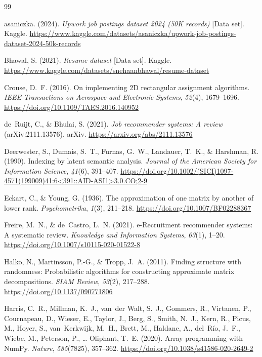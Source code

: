 \documentclass[12pt,a4paper]{article}
\numberwithin{equation}{section}
\theoremstyle{definition}
\theoremstyle{plain}
\begin{document}
\begin{thebibliography}{99}

asaniczka. (2024). \textit{Upwork job postings dataset 2024 (50K records)} [Data set]. Kaggle. \url{https://www.kaggle.com/datasets/asaniczka/upwork-job-postings-dataset-2024-50k-records}

Bhawal, S. (2021). \textit{Resume dataset} [Data set]. Kaggle. \url{https://www.kaggle.com/datasets/snehaanbhawal/resume-dataset}

Crouse, D.~F. (2016). On implementing 2D rectangular assignment algorithms. \textit{IEEE Transactions on Aerospace and Electronic Systems}, \textit{52}(4), 1679--1696. \url{https://doi.org/10.1109/TAES.2016.140952}

de~Ruijt, C., \& Bhulai, S. (2021). \textit{Job recommender systems: A review} (arXiv:2111.13576). arXiv. \url{https://arxiv.org/abs/2111.13576}

Deerwester, S., Dumais, S.~T., Furnas, G.~W., Landauer, T.~K., \& Harshman, R. (1990). Indexing by latent semantic analysis. \textit{Journal of the American Society for Information Science}, \textit{41}(6), 391--407. \url{https://doi.org/10.1002/(SICI)1097-4571(199009)41:6<391::AID-ASI1>3.0.CO;2-9}

Eckart, C., \& Young, G. (1936). The approximation of one matrix by another of lower rank. \textit{Psychometrika}, \textit{1}(3), 211--218. \url{https://doi.org/10.1007/BF02288367}

Freire, M.~N., \& de~Castro, L.~N. (2021). e-Recruitment recommender systems: A systematic review. \textit{Knowledge and Information Systems}, \textit{63}(1), 1--20. \url{https://doi.org/10.1007/s10115-020-01522-8}

Halko, N., Martinsson, P.-G., \& Tropp, J.~A. (2011). Finding structure with randomness: Probabilistic algorithms for constructing approximate matrix decompositions. \textit{SIAM Review}, \textit{53}(2), 217--288. \url{https://doi.org/10.1137/090771806}

Harris, C.~R., Millman, K.~J., van~der Walt, S.~J., Gommers, R., Virtanen, P., Cournapeau, D., Wieser, E., Taylor, J., Berg, S., Smith, N.~J., Kern, R., Picus, M., Hoyer, S., van~Kerkwijk, M.~H., Brett, M., Haldane, A., del~R\'{i}o, J.~F., Wiebe, M., Peterson, P., \ldots{} Oliphant, T.~E. (2020). Array programming with NumPy. \textit{Nature}, \textit{585}(7825), 357--362. \url{https://doi.org/10.1038/s41586-020-2649-2}


\end{thebibliography}
\end{document}
